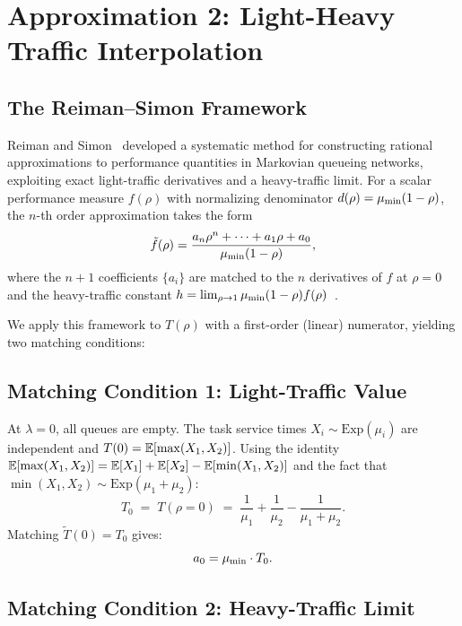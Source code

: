 \section{Approximation 2: Light-Heavy Traffic Interpolation}
\label{sec:approx-lh}

\subsection{The Reiman--Simon Framework}

Reiman and Simon~\citep{Reiman1988} developed a systematic method for
constructing rational approximations to performance quantities in Markovian
queueing networks, exploiting exact light-traffic derivatives and a
heavy-traffic limit.
For a scalar performance measure $f(\rho)$ with normalizing denominator
$d(\rho) = \mu_{\min}(1-\rho)$, the $n$-th order approximation takes the form
\begin{equation}
  \tilde{f}(\rho) = \frac{a_n\rho^n + \cdots + a_1\rho + a_0}{\mu_{\min}(1-\rho)},
\end{equation}
where the $n+1$ coefficients $\{a_i\}$ are matched to the $n$ derivatives of
$f$ at $\rho = 0$ and the heavy-traffic constant
$h = \lim_{\rho\to1}\mu_{\min}(1-\rho)f(\rho)$~\citep{Squillante2026}.

We apply this framework to $T(\rho)$ with a first-order (linear) numerator,
yielding two matching conditions:

\subsection{Matching Condition 1: Light-Traffic Value}

At $\lambda = 0$, all queues are empty.
The task service times $X_i \sim \mathrm{Exp}(\mu_i)$ are independent and
$T(0) = \mathbb{E}[\max(X_1, X_2)]$.
Using the identity $\mathbb{E}[\max(X_1,X_2)] = \mathbb{E}[X_1]+\mathbb{E}[X_2]-\mathbb{E}[\min(X_1,X_2)]$
and the fact that $\min(X_1,X_2) \sim \mathrm{Exp}(\mu_1+\mu_2)$:
\begin{equation}
  \label{eq:T0}
  T_0 \;=\; T(\rho=0) \;=\; \frac{1}{\mu_1} + \frac{1}{\mu_2}
      - \frac{1}{\mu_1 + \mu_2}.
\end{equation}
Matching $\tilde{T}(0) = T_0$ gives:
\begin{equation}
  \label{eq:a0}
  a_0 = \mu_{\min} \cdot T_0.
\end{equation}

\subsection{Matching Condition 2: Heavy-Traffic Limit}

